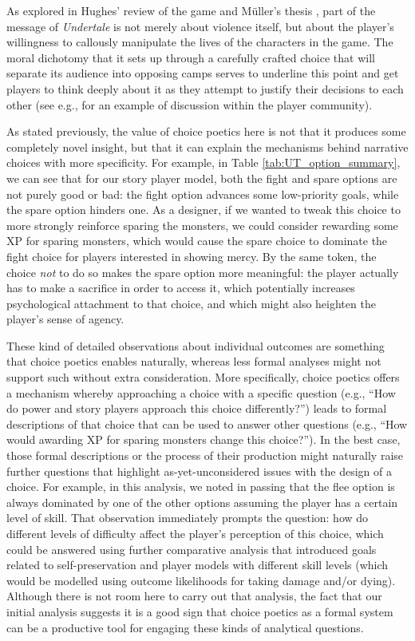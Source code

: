 \documentclass[arts,article,submit,moreauthors,pdftex,10pt,a4paper]{Definitions/mdpi}
\begin{document}
As explored in Hughes' review of the game and Müller's thesis \citep{hughes2015undertale,muller2017undertale}, part of the message of \emph{Undertale} is not merely about violence itself, but about the player's willingness to callously manipulate the lives of the characters in the game.
%
The moral dichotomy that it sets up through a carefully crafted choice that will separate its audience into opposing camps serves to underline this point and get players to think deeply about it as they attempt to justify their decisions to each other (see e.g., \cite{oh2016genocide} for an example of discussion within the player community).


As stated previously, the value of choice poetics here is not that it produces some completely novel insight, but that it can explain the mechanisms behind narrative choices with more specificity.
%
For example, in Table \ref{tab:UT_option_summary}, we can see that for our story player model, both the fight and spare options are not purely good or bad: the fight option advances some low-priority goals, while the spare option hinders one.
%
As a designer, if we wanted to tweak this choice to more strongly reinforce sparing the monsters, we could consider rewarding some XP for sparing monsters, which would cause the spare choice to dominate the fight choice for players interested in showing mercy.
%
By the same token, the choice \emph{not} to do so makes the spare option more meaningful: the player actually has to make a sacrifice in order to access it, which potentially increases psychological attachment to that choice, and which might also heighten the player's sense of agency.


These kind of detailed observations about individual outcomes are something that choice poetics enables naturally, whereas less formal analyses might not support such without extra consideration.
%
More specifically, choice poetics offers a mechanism whereby approaching a choice with a specific question (e.g., ``How do power and story players approach this choice differently?'') leads to formal descriptions of that choice that can be used to answer other questions (e.g., ``How would awarding XP for sparing monsters change this choice?'').
%
In the best case, those formal descriptions or the process of their production might naturally raise further questions that highlight as-yet-unconsidered issues with the design of a choice.
%
For example, in this analysis, we noted in passing that the flee option is always dominated by one of the other options assuming the player has a certain level of skill.
%
That observation immediately prompts the question: how do different levels of difficulty affect the player's perception of this choice, which could be answered using further comparative analysis that introduced goals related to self-preservation and player models with different skill levels (which would be modelled using outcome likelihoods for taking damage and/or dying).
%
Although there is not room here to carry out that analysis, the fact that our initial analysis suggests it is a good sign that choice poetics as a formal system can be a productive tool for engaging these kinds of analytical questions.
\end{document}
